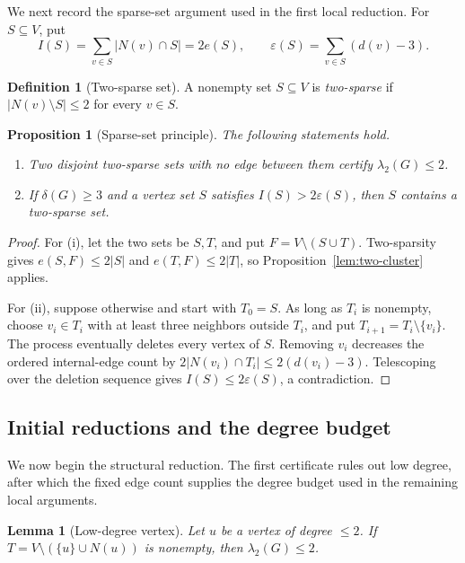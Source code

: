 \documentclass[11pt]{article}
\numberwithin{equation}{section}
\newtheorem{lemma}[theorem]{Lemma}
\newtheorem{proposition}[theorem]{Proposition}
\theoremstyle{definition}
\newtheorem{definition}[theorem]{Definition}
\theoremstyle{remark}
\newcommand{\ac}{\lambda_2}
\begin{document}
We next record the sparse-set argument used in the first local reduction.
For \(S\subseteq V\), put
\[
 I(S)=\sum_{v\in S}|N(v)\cap S|=2e(S),
 \qquad \varepsilon(S)=\sum_{v\in S}(d(v)-3).
\]

\begin{definition}[Two-sparse set]\label{def:two-sparse}
A nonempty set \(S\subseteq V\) is \emph{two-sparse} if
\(|N(v)\setminus S|\le2\) for every \(v\in S\).
\end{definition}

\begin{proposition}[Sparse-set principle]\label{prop:sparse-set-principle}
The following statements hold.
\begin{enumerate}[label=\textup{(\roman*)}]
  \item Two disjoint two-sparse sets with no edge between them certify
  \(\ac(G)\le2\).
  \item If \(\delta(G)\ge3\) and a vertex set \(S\) satisfies
  \(I(S)>2\varepsilon(S)\), then \(S\) contains a two-sparse set.
\end{enumerate}
\end{proposition}

\begin{proof}
For (i), let the two sets be \(S,T\), and put
\(F=V\setminus(S\cup T)\).  Two-sparsity gives
\(e(S,F)\le2|S|\) and \(e(T,F)\le2|T|\), so
Proposition~\ref{lem:two-cluster} applies.

For (ii), suppose otherwise and start with \(T_0=S\).  As long as \(T_i\) is
nonempty, choose \(v_i\in T_i\) with at least three neighbors outside
\(T_i\), and put \(T_{i+1}=T_i\setminus\{v_i\}\).  The process eventually
deletes every vertex of \(S\).  Removing \(v_i\) decreases the ordered
internal-edge count by \(2|N(v_i)\cap T_i|\le2(d(v_i)-3)\).  Telescoping over
the deletion sequence gives \(I(S)\le2\varepsilon(S)\), a contradiction.
\end{proof}

\subsection{Initial reductions and the degree budget}

We now begin the structural reduction.  The first certificate rules out low
degree, after which the fixed edge count supplies the degree budget used in
the remaining local arguments.

\begin{lemma}[Low-degree vertex]\label{lem:low-degree}
Let \(u\) be a vertex of degree \(\le2\).  If
\(T=V\setminus(\{u\}\cup N(u))\) is nonempty, then \(\ac(G)\le2\).
\end{lemma}
\end{document}
